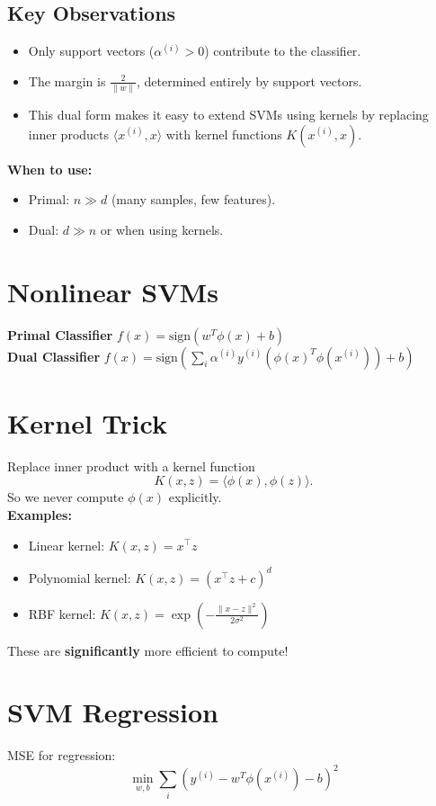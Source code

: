 \documentclass[11pt]{article}
\begin{document}
\subsection*{Key Observations}
\begin{itemize}
    \item Only support vectors ($\alpha^{(i)} > 0$) contribute to the classifier.
    \item The margin is $\tfrac{2}{\|w\|}$, determined entirely by support vectors.
    \item This dual form makes it easy to extend SVMs using kernels by replacing inner products $\langle x^{(i)}, x \rangle$ with kernel functions $K(x^{(i)}, x)$.
\end{itemize}

\textbf{When to use:}
\begin{itemize}
    \item Primal: $n \gg d$ (many samples, few features).
    \item Dual: $d \gg n$ or when using kernels.
\end{itemize}

\pagebreak
\section*{Nonlinear SVMs}
\textbf{Primal Classifier} \(f(x) = \text{sign}(w^T \phi (x) + b)\) \\ 
\textbf{Dual Classifier} \(f(x) = \text{sign}\left( \sum_i \alpha^{(i)} y^{(i)} (\phi{(x)^T\phi{(x^{(i)})}}) + b \right)\) \\

\section*{Kernel Trick}

Replace inner product with a kernel function
\[
K(x,z) = \langle \phi(x), \phi(z)\rangle.
\]
So we never compute $\phi(x)$ explicitly. \\

\textbf{Examples:}
\begin{itemize}
    \item Linear kernel: $K(x,z) = x^\top z$
    \item Polynomial kernel: $K(x,z) = (x^\top z + c)^d$
    \item RBF kernel: $K(x,z) = \exp\!\left(-\tfrac{\|x-z\|^2}{2\sigma^2}\right)$
\end{itemize}
These are \textbf{significantly} more efficient to compute!

\pagebreak

\section*{SVM Regression}
MSE for regression:
\[
\min_{w,b} \sum_i (y^{(i)} - w^T \phi{(x^{(i)})} - b)^2
\]
\end{document}
